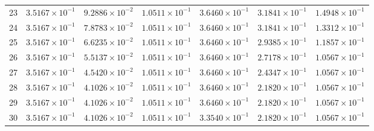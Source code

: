 \begin{table}[H]
\begin{tabular}{@{}rrrrrrr@{}}
23 & $3.5167\times10^{-1}$ & $9.2886\times10^{-2}$ & $1.0511\times10^{-1}$ & $3.6460\times10^{-1}$ & $3.1841\times10^{-1}$ & $1.4948\times10^{-1}$\\
24 & $3.5167\times10^{-1}$ & $7.8783\times10^{-2}$ & $1.0511\times10^{-1}$ & $3.6460\times10^{-1}$ & $3.1841\times10^{-1}$ & $1.3312\times10^{-1}$\\
25 & $3.5167\times10^{-1}$ & $6.6235\times10^{-2}$ & $1.0511\times10^{-1}$ & $3.6460\times10^{-1}$ & $2.9385\times10^{-1}$ & $1.1857\times10^{-1}$\\
26 & $3.5167\times10^{-1}$ & $5.5137\times10^{-2}$ & $1.0511\times10^{-1}$ & $3.6460\times10^{-1}$ & $2.7178\times10^{-1}$ & $1.0567\times10^{-1}$\\
27 & $3.5167\times10^{-1}$ & $4.5420\times10^{-2}$ & $1.0511\times10^{-1}$ & $3.6460\times10^{-1}$ & $2.4347\times10^{-1}$ & $1.0567\times10^{-1}$\\
28 & $3.5167\times10^{-1}$ & $4.1026\times10^{-2}$ & $1.0511\times10^{-1}$ & $3.6460\times10^{-1}$ & $2.1820\times10^{-1}$ & $1.0567\times10^{-1}$\\
29 & $3.5167\times10^{-1}$ & $4.1026\times10^{-2}$ & $1.0511\times10^{-1}$ & $3.6460\times10^{-1}$ & $2.1820\times10^{-1}$ & $1.0567\times10^{-1}$\\
30 & $3.5167\times10^{-1}$ & $4.1026\times10^{-2}$ & $1.0511\times10^{-1}$ & $3.3540\times10^{-1}$ & $2.1820\times10^{-1}$ & $1.0567\times10^{-1}$\\
\bottomrule
\end{tabular}
\end{table}


